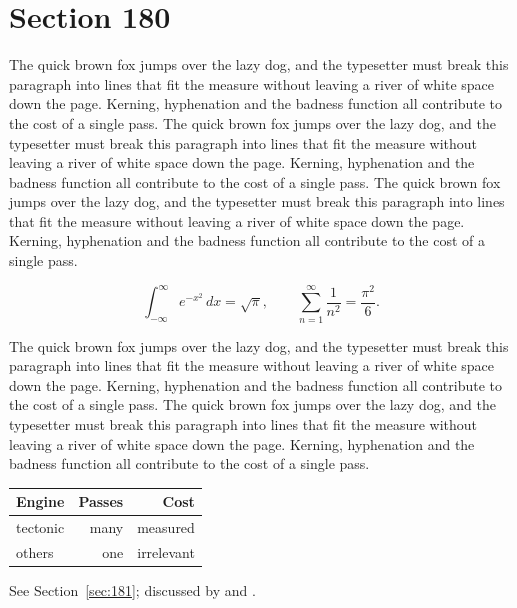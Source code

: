 \documentclass{article}
\begin{document}
\section{Section 180}
\label{sec:180}
The quick brown fox jumps over the lazy dog, and the typesetter must break this paragraph into lines that fit the measure without leaving a river of white space down the page. Kerning, hyphenation and the badness function all contribute to the cost of a single pass. The quick brown fox jumps over the lazy dog, and the typesetter must break this paragraph into lines that fit the measure without leaving a river of white space down the page. Kerning, hyphenation and the badness function all contribute to the cost of a single pass. The quick brown fox jumps over the lazy dog, and the typesetter must break this paragraph into lines that fit the measure without leaving a river of white space down the page. Kerning, hyphenation and the badness function all contribute to the cost of a single pass. 

\begin{equation}\label{eq:180}
\int_{-\infty}^{\infty} e^{-x^{2}}\,dx = \sqrt{\pi}, \qquad
\sum_{n=1}^{\infty} \frac{1}{n^{2}} = \frac{\pi^{2}}{6}.
\end{equation}

The quick brown fox jumps over the lazy dog, and the typesetter must break this paragraph into lines that fit the measure without leaving a river of white space down the page. Kerning, hyphenation and the badness function all contribute to the cost of a single pass. The quick brown fox jumps over the lazy dog, and the typesetter must break this paragraph into lines that fit the measure without leaving a river of white space down the page. Kerning, hyphenation and the badness function all contribute to the cost of a single pass. 

\begin{center}
\begin{tabular}{lrr}
\toprule
Engine & Passes & Cost \\
\midrule
tectonic & many & measured \\
others & one & irrelevant \\
\bottomrule
\end{tabular}
\end{center}

See Section~\ref{sec:181}; discussed by \textcite{k1} and \textcite{l3}.
\end{document}
